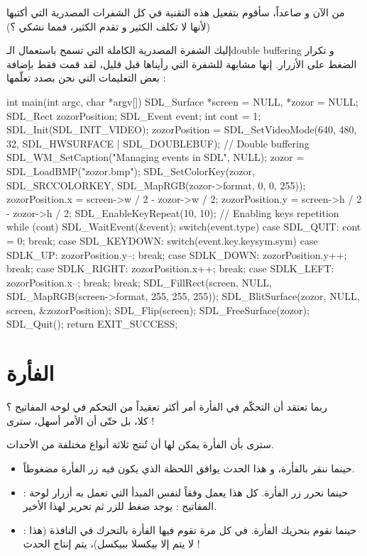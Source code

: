 من الآن و صاعداً، سأقوم بتفعيل هذه التقنية في كل الشفرات المصدرية التي أكتبها (لأنها لا تكلف الكثير و تقدم الكثير، فمما نشكي ؟)

إليك الشفرة المصدرية الكاملة التي تسمح باستعمال الـ\textenglish{double buffering}
و تكرار الضغط على الأزرار. إنها مشابهة للشفرة التي رأيناها قبل قليل، لقد قمت فقط بإضافة بعض التعليمات التي نحن بصدد تعلّمها :

\begin{Csource}
int main(int argc, char *argv[])
{
	SDL_Surface *screen = NULL, *zozor = NULL;
	SDL_Rect zozorPosition;
	SDL_Event event;
	int cont = 1;
	SDL_Init(SDL_INIT_VIDEO);
	zozorPosition = SDL_SetVideoMode(640, 480, 32, SDL_HWSURFACE | SDL_DOUBLEBUF); // Double buffering
	SDL_WM_SetCaption("Managing events in SDL", NULL);
	zozor = SDL_LoadBMP("zozor.bmp");
	SDL_SetColorKey(zozor, SDL_SRCCOLORKEY, SDL_MapRGB(zozor->format, 0, 0, 255));
	zozorPosition.x = screen->w / 2 - zozor->w / 2;
	zozorPosition.y = screen->h / 2 - zozor->h / 2;
	SDL_EnableKeyRepeat(10, 10); // Enabling keys repetition
	while (cont)
	{
		SDL_WaitEvent(&event);
		switch(event.type)
		{
			case SDL_QUIT:
			cont = 0;
			break;
			case SDL_KEYDOWN:
			switch(event.key.keysym.sym)
			{
				case SDLK_UP:
				zozorPosition.y--;
				break;
				case SDLK_DOWN:
				zozorPosition.y++;
				break;
				case SDLK_RIGHT:
				zozorPosition.x++;
				break;
				case SDLK_LEFT:
				zozorPosition.x--;
				break;
			}
			break;
		}
		SDL_FillRect(screen, NULL, SDL_MapRGB(screen->format, 255, 255, 255));
		SDL_BlitSurface(zozor, NULL, screen, &zozorPosition);
		SDL_Flip(screen);
	}
	SDL_FreeSurface(zozor);
	SDL_Quit();
	return EXIT_SUCCESS;
}
\end{Csource}

\section{الفأرة}

ربما تعتقد أن التحكّم في الفأرة أمر أكثر تعقيداً من التحكم في لوحة المفاتيح ؟\\
كلا، بل حتّى أن الأمر أسهل، سترى !

سترى بأن الفأرة يمكن لها أن تُنتج ثلاثة أنواع مختلفة من الأحداث.

\begin{itemize}
	\item {}
	حينما ننقر بالفأرة، و هذا الحدث يوافق اللحظة الذي يكون فيه زر الفأرة مضغوطاً.
	\item {} :
	حينما نحرر زر الفأرة. كل هذا يعمل وفقاً لنفس المبدأ التي تعمل به أزرار لوحة المفاتيح : يوجد ضغط للزر ثم تحرير لهذا الأخير.
	\item {} :
	حينما نقوم بتحريك الفأرة. في كل مرة تقوم فيها الفأرة بالتحرك في النافذة (هذا لا يتم إلا بيكسلا ببيكسل)، يتم إنتاج الحدث 
	 !
\end{itemize}
 
